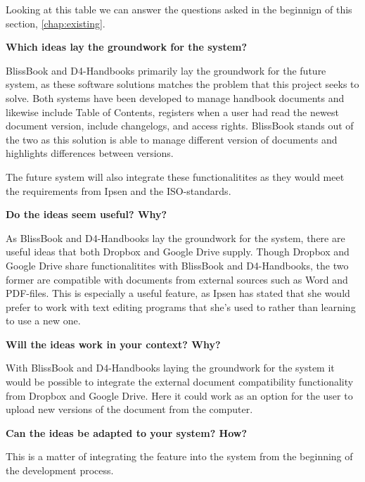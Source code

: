 Looking at this table we can answer the questions asked in the beginnign of this section, \cref{chap:existing}.

\textbf{Which ideas lay the groundwork for the system?}

BlissBook and D4-Handbooks primarily lay the groundwork for the future system, as these software solutions matches the problem that this project seeks to solve.
Both systems have been developed to manage handbook documents and likewise include Table of Contents, registers when a user had read the newest document version, include changelogs, and access rights.
BlissBook stands out of the two as this solution is able to manage different version of documents and highlights differences between versions.

The future system will also integrate these functionalitites as they would meet the requirements from Ipsen and the ISO-standards.

\textbf{Do the ideas seem useful? Why?}

As BlissBook and D4-Handbooks lay the groundwork for the system, there are useful ideas that both Dropbox and Google Drive supply.
Though Dropbox and Google Drive share functionalitites with BlissBook and D4-Handbooks, the two former are compatible with documents from external sources such as Word and PDF-files.
This is especially a useful feature, as Ipsen has stated that she would prefer to work with text editing programs that she's used to rather than learning to use a new one.


\textbf{Will the ideas work in your context? Why?}

With BlissBook and D4-Handbooks laying the groundwork for the system it would be possible to integrate the external document compatibility functionality from Dropbox and Google Drive.
Here it could work as an option for the user to upload new versions of the document from the computer.


\textbf{Can the ideas be adapted to your system? How?}

This is a matter of integrating the feature into the system from the beginning of the development process.

